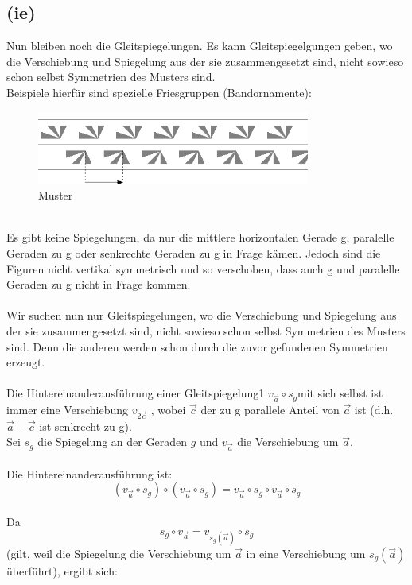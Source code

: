 \documentclass[12pt,a4paper]{article}
\begin{document}
\subsection*{(ie)}
Nun bleiben noch die Gleitspiegelungen. Es kann Gleitspiegelgungen geben, wo die Verschiebung und Spiegelung aus der sie zusammengesetzt sind, nicht sowieso schon selbst Symmetrien des Musters sind.\\
Beispiele hierfür sind spezielle Friesgruppen (Bandornamente):\\
\begin{figure}[htbp]
    \centering
    \includegraphics[width=0.8\textwidth]{Blatt07_Aufgabe_19_ie.png}
    \caption{Muster}
    \label{fig:Aufgabe_19}
\end{figure}
\\
Es gibt keine Spiegelungen, da nur die mittlere horizontalen Gerade g, paralelle Geraden zu g oder senkrechte Geraden zu g in Frage kämen. Jedoch sind die Figuren nicht vertikal symmetrisch und so verschoben, dass auch g und paralelle Geraden zu g nicht in Frage kommen.\\
\\
\noindent Wir suchen nun nur Gleitspiegelungen, wo die Verschiebung und Spiegelung aus der sie zusammengesetzt sind, nicht sowieso schon selbst Symmetrien des Musters sind. Denn die anderen werden schon durch die zuvor gefundenen Symmetrien erzeugt.\\
\\
Die Hintereinanderausführung einer Gleitspiegelung1 $v_{\vec{a}} \circ s_g $mit sich selbst ist immer eine Verschiebung
$v_{2\vec{c}}$ , wobei $\vec{c}$ der zu g parallele Anteil von $\vec{a}$ ist (d.h. $\vec{a} - \vec{c}$ ist senkrecht zu g).\\
Sei $s_g$ die Spiegelung an der Geraden $g$ und $v_{\vec{a}}$ die Verschiebung um $\vec{a}$.\\
\\
Die Hintereinanderausführung ist:
\[
(v_{\vec{a}} \circ s_g) \circ (v_{\vec{a}} \circ s_g) = v_{\vec{a}} \circ s_g \circ v_{\vec{a}} \circ s_g
\]
\\
Da 
\[
s_g \circ v_{\vec{a}} = v_{s_g(\vec{a})} \circ s_g
\]
(gilt, weil die Spiegelung die Verschiebung um $\vec{a}$ in eine Verschiebung um $s_g(\vec{a})$ überführt), ergibt sich:
\end{document}
